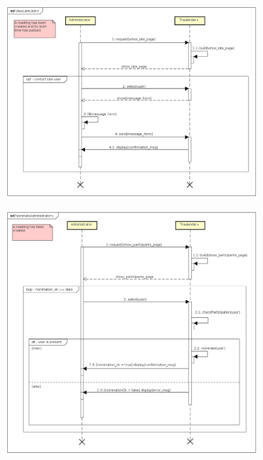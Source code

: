 \begin{figure}[H]
\centering\includegraphics[width=\textwidth]{Images/SequenceDiagrams/Admin/ViewLateUsers.png}{}
\caption{}
\end{figure}

\begin{figure}[H]
\centering\includegraphics[width=\textwidth]{Images/SequenceDiagrams/Admin/NominateAdministrators.png}{}
\caption{}
\end{figure}

